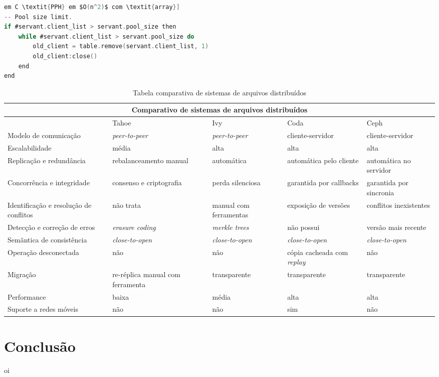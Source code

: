 \documentclass[11pt]{article}
\begin{document}
\begin{lstlisting}[label={connpool},language=C,caption=Connection Pool]
em C \textit{PPH} em $O(n^2)$ com \textit{array}]
-- Pool size limit.
if #servant.client_list > servant.pool_size then
    while #servant.client_list > servant.pool_size do
        old_client = table.remove(servant.client_list, 1)
        old_client:close()
    end
end
\end{lstlisting}

\renewcommand{\arraystretch}{2}
\begin{table}
\begin{center}
{\footnotesize \begin{tabular}{p{2.5cm} p{2.5cm} p{2.5cm} p{2.5cm} p{2.5cm}}
\hline
\multicolumn{5}{c}{Comparativo de sistemas de arquivos distribuídos} \\ \hline
~ & Tahoe & Ivy & Coda & Ceph \\ \hline
Modelo de comunicação & \textit{peer-to-peer} & \textit{peer-to-peer} & cliente-servidor & cliente-servidor \\
Escalabilidade & média & alta & alta & alta \\
Replicação e redundância & rebalanceamento manual & automática & automática pelo cliente & automática no servidor \\
Concorrência e integridade & consenso e criptografia & perda silenciosa & garantida por callbacks & garantida por sincronia \\
Identificação e resolução de conflitos & não trata & manual com ferramentas & exposição de versões & conflitos inexistentes \\
Detecção e correção de erros & \textit{erasure coding} & \textit{merkle trees} & não possui & versão mais recente \\
Semãntica de consistência & \textit{close-to-open} & \textit{close-to-open} & \textit{close-to-open} & \textit{close-to-open} \\
Operação desconectada & não & não & cópia cacheada com \textit{replay} & não \\ 
Migração & re-réplica manual com ferramenta & transparente & transparente & transparente \\
Performance & baixa & média & alta & alta \\
Suporte a redes móveis & não & não & sim & não \\
\hline
\end{tabular}}
\caption{Tabela comparativa de sistemas de arquivos distribuídos}
\label{tab:compare}
\end{center}
\end{table}

\section{Conclusão}\label{sec:conclusion}

oi



\end{document}
